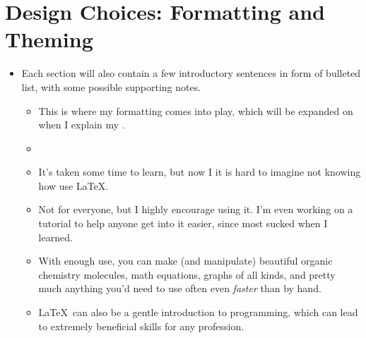 \documentclass{inVerba-notes}
\begin{document}
\section{Design Choices: Formatting and Theming}\label{design choices}
\begin{itemize}
    \item Each section will also contain a few introductory sentences in form of bulleted list, with some possible supporting notes.
    \begin{itemize}
        \item This is where my formatting comes into play, which will be expanded on when I explain my \hyperref[design choices]{}.
        \item \hyperref[Chunking]{}
    \end{itemize}
        \begin{itemize}
                        \item It's taken some time to learn, but now I it is hard to imagine not knowing how use \LaTeX. 
                        \item Not for everyone, but I highly encourage using it. I'm even working on a tutorial to help anyone get into it easier, since most sucked when I learned.
                        \item With enough use, you can make (and manipulate) beautiful organic chemistry molecules, math equations, graphs of all kinds, and pretty much anything you'd need to use often even \textit{faster} than by hand.
                        \item \LaTeX~can also be a gentle introduction to programming, which can lead to extremely beneficial skills for any profession.
                    \end{itemize}
\end{itemize}

 
\end{document}
